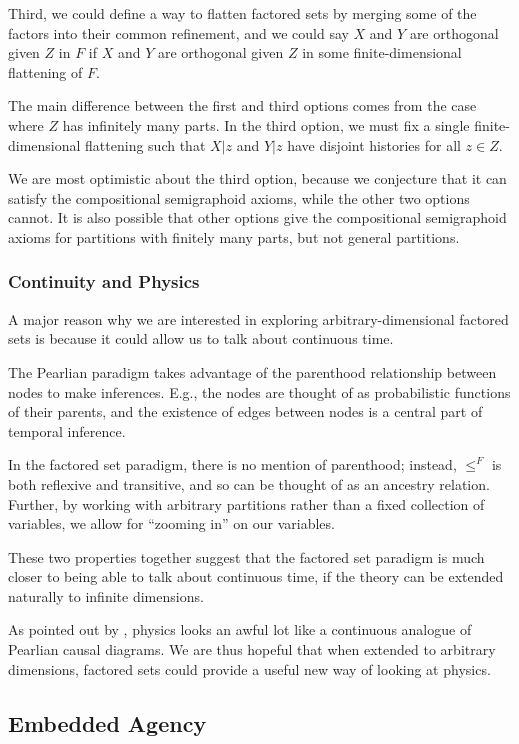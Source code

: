 \documentclass[authordate,onecolumn]{miri-tech-article}
\begin{document}
Third, we could define a way to flatten factored sets by merging some of the factors into their common refinement, and we could say $X$ and $Y$ are orthogonal given $Z$ in $F$ if $X$ and $Y$ are orthogonal given $Z$ in some finite-dimensional flattening of $F$. 

The main difference between the first and third options comes from the case where $Z$ has infinitely many parts. In the third option, we must fix a single finite-dimensional flattening such that $X|z$ and $Y|z$ have disjoint histories for all $z\in Z$.

We are most optimistic about the third option, because we conjecture that it can satisfy the compositional semigraphoid axioms, while the other two options cannot. It is also possible that other options give the compositional semigraphoid axioms for partitions with finitely many parts, but not general partitions.

\subsubsection{Continuity and Physics}
A major reason why we are interested in exploring arbitrary-dimensional factored sets is because it could allow us to talk about continuous time. 

The Pearlian paradigm takes advantage of the parenthood relationship between nodes to make inferences. E.g., the nodes are thought of as probabilistic functions of their parents, and the existence of edges between nodes is a central part of temporal inference. 

In the factored set paradigm, there is no mention of parenthood; instead, $\leq^F$ is both reflexive and transitive, and so can be thought of as an ancestry relation. Further, by working with arbitrary partitions rather than a fixed collection of variables, we allow for ``zooming in'' on our variables.

These two properties together suggest that the factored set paradigm is much closer to being able to talk about continuous time, if the theory can be extended naturally to infinite dimensions. 

As pointed out by \citet{Yudkowsky:2012}, physics looks an awful lot like a continuous analogue of Pearlian causal diagrams. We are thus hopeful that when extended to arbitrary dimensions, factored sets could provide a useful new way of looking at physics.

\subsection{Embedded Agency}
\end{document}
